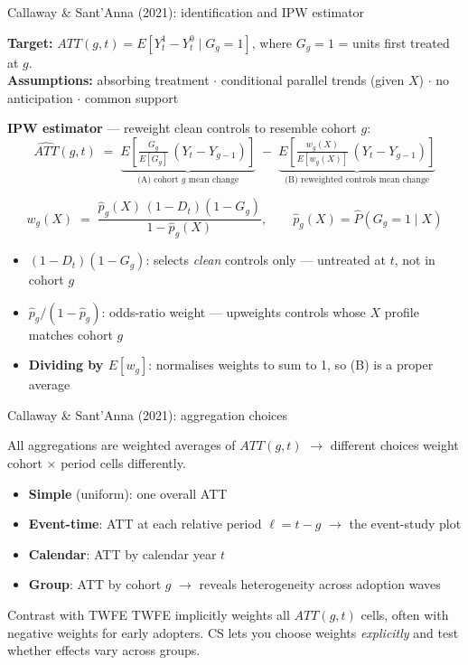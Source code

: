 \documentclass[aspectratio=169, 10pt]{beamer}
\begin{document}
\begin{frame}{Callaway \& Sant'Anna (2021): identification and IPW estimator}

  \textbf{Target:} $ATT(g,t) = E[Y_t^1 - Y_t^0 \mid G_g=1]$, where $G_g=1$ = units first treated at $g$.\\[2pt]
  \textbf{Assumptions:} absorbing treatment $\cdot$ conditional parallel trends (given $X$) $\cdot$ no anticipation $\cdot$ common support

  \medskip
  \textbf{IPW estimator} — reweight clean controls to resemble cohort $g$:
  \[
    \widehat{ATT}(g,t) \;=\;
      \underbrace{E\!\left[\tfrac{G_g}{E[G_g]}\,(Y_t - Y_{g-1})\right]}_{\text{(A) cohort }g\text{ mean change}}
    \;-\;
      \underbrace{E\!\left[\tfrac{w_g(X)}{E[w_g(X)]}\,(Y_t - Y_{g-1})\right]}_{\text{(B) reweighted controls mean change}}
  \]

  \smallskip
  \[
    w_g(X) \;=\; \frac{\hat{p}_g(X)\,(1-D_t)(1-G_g)}{1-\hat{p}_g(X)}, \qquad
    \hat{p}_g(X) = \widehat{P}(G_g=1\mid X)
  \]

  \smallskip
  {\footnotesize
  \begin{itemize}
    \item \textbf{$(1-D_t)(1-G_g)$}: selects \emph{clean} controls only — untreated at $t$, not in cohort $g$
    \item \textbf{$\hat{p}_g/(1-\hat{p}_g)$}: odds-ratio weight — upweights controls whose $X$ profile matches cohort $g$
    \item \textbf{Dividing by $E[w_g]$}: normalises weights to sum to 1, so (B) is a proper average
  \end{itemize}}

\end{frame}

\begin{frame}{Callaway \& Sant'Anna (2021): aggregation choices}

  All aggregations are weighted averages of $ATT(g,t)$ $\rightarrow$ different choices weight cohort $\times$ period cells differently.

  \medskip
  \begin{itemize}
    \item \textbf{Simple} (uniform): one overall ATT
    \item \textbf{Event-time}: ATT at each relative period $\ell = t-g$ $\rightarrow$ the event-study plot
    \item \textbf{Calendar}: ATT by calendar year $t$
    \item \textbf{Group}: ATT by cohort $g$ $\rightarrow$ reveals heterogeneity across adoption waves
  \end{itemize}

  \medskip
  \begin{alertblock}{Contrast with TWFE}
    TWFE implicitly weights all $ATT(g,t)$ cells, often with negative weights for early adopters. CS lets you choose weights \emph{explicitly} and test whether effects vary across groups.
  \end{alertblock}

\end{frame}
\end{document}
